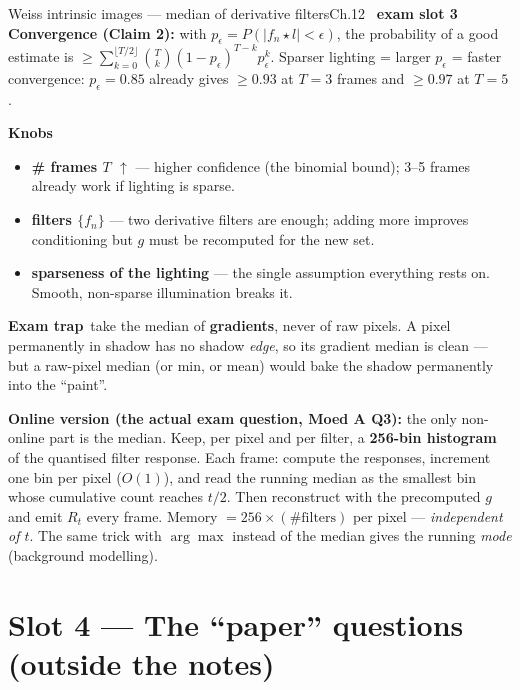 \documentclass[9pt,a4paper]{extarticle}
\newcommand{\KNOBS}{\par\smallskip\textbf{Knobs}\par\nopagebreak}
\newcommand{\TRAP}{\par\smallskip\textbf{\color{cTrap}Exam trap}\ }
\newcommand{\up}{$\uparrow$}
\newcommand{\kn}[2]{\item \textbf{#1} --- #2}
\begin{document}
\begin{card}{Weiss intrinsic images --- median of derivative filters}{Ch.12 \textbullet\ \textbf{exam slot 3}}
\smallskip
\textbf{Convergence (Claim 2):} with $p_\epsilon=P(|f_n\star l|<\epsilon)$, the probability of a good estimate is $\ge\sum_{k=0}^{\lfloor T/2\rfloor}\binom Tk(1-p_\epsilon)^{T-k}p_\epsilon^k$. Sparser lighting = larger $p_\epsilon$ = faster convergence: $p_\epsilon=0.85$ already gives $\ge0.93$ at $T=3$ frames and $\ge0.97$ at $T=5$.

\KNOBS
\begin{itemize}
  \kn{\# frames $T$ \up}{higher confidence (the binomial bound); 3--5 frames already work if lighting is sparse.}
  \kn{filters $\{f_n\}$}{two derivative filters are enough; adding more improves conditioning but $g$ must be recomputed for the new set.}
  \kn{sparseness of the lighting}{the single assumption everything rests on. Smooth, non-sparse illumination breaks it.}
\end{itemize}
\TRAP take the median of \textbf{gradients}, never of raw pixels. A pixel permanently in shadow has no shadow \emph{edge}, so its gradient median is clean --- but a raw-pixel median (or min, or mean) would bake the shadow permanently into the ``paint''.

\smallskip
\textbf{Online version (the actual exam question, Moed A Q3):} the only non-online part is the median. Keep, per pixel and per filter, a \textbf{256-bin histogram} of the quantised filter response. Each frame: compute the responses, increment one bin per pixel ($O(1)$), and read the running median as the smallest bin whose cumulative count reaches $t/2$. Then reconstruct with the precomputed $g$ and emit $R_t$ every frame. Memory $=256\times(\#\text{filters})$ per pixel --- \emph{independent of $t$}. The same trick with $\arg\max$ instead of the median gives the running \emph{mode} (background modelling).
\end{card}

\section{Slot 4 --- The ``paper'' questions (outside the notes)}
\end{document}
